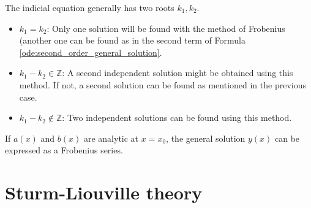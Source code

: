     \begin{property}
        The indicial equation generally has two roots $k_1,k_2$.
        \begin{itemize}
            \item $k_1=k_2$: Only one solution will be found with the method of Frobenius (another one can be found as in the second term of Formula \ref{ode:second_order_general_solution}.
            \item $k_1-k_2 \in\mathbb{Z}$: A second independent solution might be obtained using this method. If not, a second solution can be found as mentioned in the previous case.
            \item $k_1-k_2\not\in\mathbb{Z}$: Two independent solutions can be found using this method.
        \end{itemize}
    \end{property}

    \begin{theorem}[Fuchs]
        If $a(x)$ and $b(x)$ are analytic at $x=x_0$, the general solution $y(x)$ can be expressed as a Frobenius series.
    \end{theorem}

\section{Sturm-Liouville theory}


